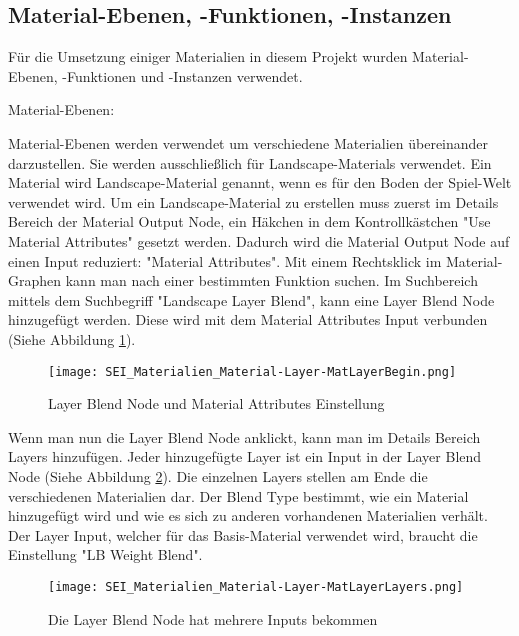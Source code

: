 \subsection{Material-Ebenen, -Funktionen, -Instanzen}
\label{sec:mat_lay_func_ins}

Für die Umsetzung einiger Materialien in diesem Projekt wurden Material-Ebenen, -Funktionen und -Instanzen verwendet.

Material-Ebenen\citep{ue:mat_landscape}:

Material-Ebenen werden verwendet um verschiedene Materialien übereinander darzustellen. Sie werden ausschließlich für
Landscape-Materials verwendet. Ein Material wird Landscape-Material genannt, wenn es für den Boden der Spiel-Welt
verwendet wird. Um ein Landscape-Material zu erstellen muss zuerst im Details Bereich der Material Output Node, ein
Häkchen in dem Kontrollkästchen "Use Material Attributes" gesetzt werden. Dadurch wird die Material Output Node auf
einen Input reduziert: "Material Attributes". Mit einem Rechtsklick im Material-Graphen kann man nach einer bestimmten
Funktion suchen. Im Suchbereich mittels dem Suchbegriff "Landscape Layer Blend", kann eine Layer Blend Node hinzugefügt
werden. Diese wird mit dem Material Attributes Input verbunden (Siehe Abbildung \ref{picture:layer_blend}).

\begin{figure}[H]
    \centering
    \texttt{[image: SEI\_Materialien\_Material-Layer-MatLayerBegin.png]}
    \caption{Layer Blend Node und Material Attributes Einstellung}
    \label{picture:layer_blend}
\end{figure}

Wenn man nun die Layer Blend Node anklickt, kann man im Details Bereich Layers hinzufügen. Jeder hinzugefügte Layer
ist ein Input in der Layer Blend Node (Siehe Abbildung \ref{picture:layers}). Die einzelnen Layers stellen am Ende die verschiedenen
Materialien dar. Der Blend Type bestimmt, wie ein Material hinzugefügt wird und wie es sich zu anderen vorhandenen
Materialien verhält. Der Layer Input, welcher für das Basis-Material verwendet wird, braucht die Einstellung "LB Weight Blend".

\begin{figure}[H]
    \centering
    \texttt{[image: SEI\_Materialien\_Material-Layer-MatLayerLayers.png]}
    \caption{Die Layer Blend Node hat mehrere Inputs bekommen}
    \label{picture:layers}
\end{figure}

